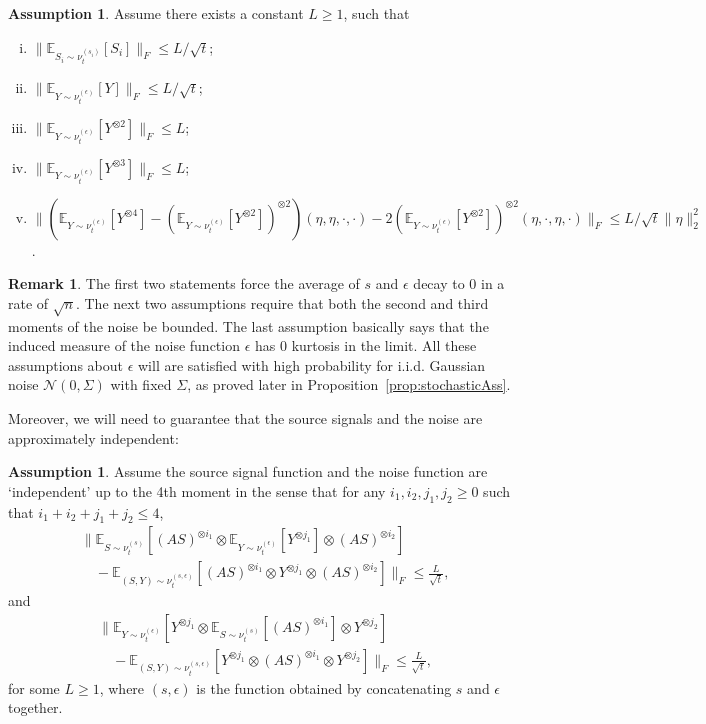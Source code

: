 \documentclass{article}
\newcommand{\E}{\mathbb{E}}
\newcommand{\iid}{i.i.d.\xspace}
\theoremstyle{definition}
\newtheorem{remark}[lemma]{Remark}
\newtheorem{assumption}[lemma]{Assumption}
\begin{document}
\begin{assumption}
\label{ass:gauss}
Assume there exists a constant $L\ge 1$, such that 
\begin{enumerate}[(i)]
\vspace{-3mm}
\item $\| \E_{S_i\sim \nu_t^{(s_i)}} [S_i] \|_F\le L/\sqrt{t}$;
\item $\| \E_{Y \sim \nu_t^{(\epsilon)}} [Y] \|_F \le L/\sqrt{t}$;
\item $\| \E_{Y\sim \nu_t^{(\epsilon)}} [Y^{\otimes 2}] \|_F \le L$;
\item $\| \E_{Y\sim \nu_t^{(\epsilon)}} [Y^{\otimes 3}] \|_F \le L$;
\item $\| \left(\E_{Y\sim \nu_t^{(\epsilon)}} [Y^{\otimes4}] - (\E_{Y\sim \nu_t^{(\epsilon)}} [Y^{\otimes2}])^{\otimes 2}\right)(\eta,\eta,\cdot,\cdot)  - 2 (\E_{Y\sim \nu_t^{(\epsilon)}} [Y^{\otimes2}])^{\otimes 2}(\eta,\cdot,\eta,\cdot)\|_F\le L/\sqrt{t}\|\eta\|_2^2$.
\end{enumerate}
\end{assumption}
\begin{remark}
The first two statements force the average of $s$ and $\epsilon$ decay to 0 in a rate of $\sqrt{n}$.
The next two assumptions require that both the second and third moments of the noise be bounded.
The last assumption basically says that the induced measure of the noise function $\epsilon$ has 0 kurtosis in the limit.
All these assumptions about $\epsilon$ will are satisfied with high probability for \iid Gaussian noise $\mathcal{N}(0,\Sigma)$ with fixed $\Sigma$, as proved later in Proposition~\ref{prop:stochasticAss}.
\end{remark}
Moreover, we will need to guarantee that the source signals and the noise are approximately independent:
\begin{assumption}
\label{ass:independence}
Assume the source signal function and the noise function are `independent' up to the 4th moment in the sense that for any $i_1,i_2,j_1,j_2 \ge 0$ such that $i_1+i_2+j_1+j_2 \le 4$,  
\begin{align*}
& \| \E_{S\sim \nu_t^{(s)}} [(AS)^{\otimes i_1}\otimes \E_{Y\sim \nu_t^{(\epsilon)}} [Y^{\otimes j_1}] \otimes (AS)^{\otimes i_2}]\\
& \quad - \E_{(S, Y)\sim \nu_t^{(s, \epsilon)}} [(AS)^{\otimes i_1}\otimes Y^{\otimes j_1}\otimes (AS)^{\otimes i_2}]  \|_F 
 \le\frac{L}{\sqrt{t}},
\end{align*}
and 
\begin{align*}
& \| \E_{Y\sim \nu_t^{(\epsilon)}} [Y^{\otimes j_1} \otimes \E_{S\sim \nu_t^{(s)}} [(AS)^{\otimes i_1}] \otimes Y^{\otimes j_2}] \\
& \quad - \E_{(S, Y)\sim \nu_t^{(s, \epsilon)}} [ Y^{\otimes j_1}\otimes (AS)^{\otimes i_1}\otimes Y^{\otimes j_2}] \|_F 
\le\frac{L}{\sqrt{t}}, %
\end{align*}
for some $L \ge 1$, where $(s,\epsilon)$ is the function obtained by concatenating $s$ and $\epsilon$ together.  
\end{assumption}
\end{document}
